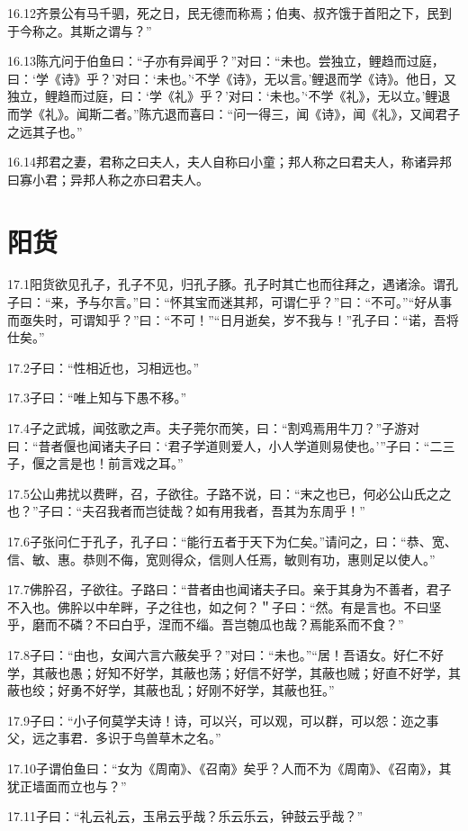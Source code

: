 \documentclass[a4paper,12pt,UTF8,twoside]{ctexbook}
\begin{document}
16.12齐景公有马千驷，死之日，民无德而称焉；伯夷、叔齐饿于首阳之下，民到于今称之。其斯之谓与？”

16.13陈亢问于伯鱼曰：“子亦有异闻乎？”对曰：“未也。尝独立，鲤趋而过庭，曰：‘学《诗》乎？’对曰：‘未也。’‘不学《诗》，无以言。’鲤退而学《诗》。他日，又独立，鲤趋而过庭，曰：‘学《礼》乎？’对曰：‘未也。’‘不学《礼》，无以立。’鲤退而学《礼》。闻斯二者。”陈亢退而喜曰：“问一得三，闻《诗》，闻《礼》，又闻君子之远其子也。”

16.14邦君之妻，君称之曰夫人，夫人自称曰小童；邦人称之曰君夫人，称诸异邦曰寡小君；异邦人称之亦曰君夫人。

\chapter{阳货}
17.1阳货欲见孔子，孔子不见，归孔子豚。孔子时其亡也而往拜之，遇诸涂。谓孔子曰：“来，予与尔言。”曰：“怀其宝而迷其邦，可谓仁乎？”曰：“不可。”“好从事而亟失时，可谓知乎？”曰：“不可！”“日月逝矣，岁不我与！”孔子曰：“诺，吾将仕矣。”

17.2子曰：“性相近也，习相远也。”

17.3子曰：“唯上知与下愚不移。”

17.4子之武城，闻弦歌之声。夫子莞尔而笑，曰：“割鸡焉用牛刀？”子游对曰：“昔者偃也闻诸夫子曰：‘君子学道则爱人，小人学道则易使也。’”子曰：“二三
子，偃之言是也！前言戏之耳。”

17.5公山弗扰以费畔，召，子欲往。子路不说，曰：“末之也已，何必公山氏之之也？”子曰：“夫召我者而岂徒哉？如有用我者，吾其为东周乎！”

17.6子张问仁于孔子，孔子曰：“能行五者于天下为仁矣。”请问之，曰：“恭、宽、信、敏、惠。恭则不侮，宽则得众，信则人任焉，敏则有功，惠则足以使人。”

17.7佛肸召，子欲往。子路曰：“昔者由也闻诸夫子曰。亲于其身为不善者，君子不入也。佛肸以中牟畔，子之往也，如之何？＂子曰：“然。有是言也。不曰坚乎，磨而不磷？不曰白乎，涅而不缁。吾岂匏瓜也哉？焉能系而不食？”

17.8子曰：“由也，女闻六言六蔽矣乎？”对曰：“未也。”“居！吾语女。好仁不好学，其蔽也愚；好知不好学，其蔽也荡；好信不好学，其蔽也贼；好直不好学，其蔽也绞；好勇不好学，其蔽也乱；好刚不好学，其蔽也狂。”

17.9子曰：“小子何莫学夫诗！诗，可以兴，可以观，可以群，可以怨：迩之事父，远之事君．多识于鸟兽草木之名。”

17.10子谓伯鱼曰：“女为《周南》、《召南》矣乎？人而不为《周南》、《召南》，其犹正墙面而立也与？”

17.11子曰：“礼云礼云，玉帛云乎哉？乐云乐云，钟鼓云乎哉？”
\end{document}

